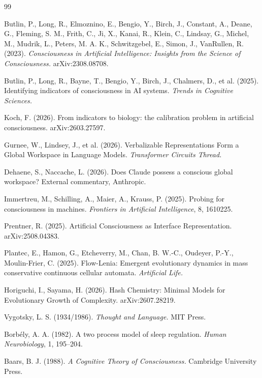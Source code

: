 \documentclass[11pt]{article}
\begin{document}
\begin{thebibliography}{99}

Butlin, P., Long, R., Elmoznino, E., Bengio, Y., Birch, J., Constant, A., Deane, G., Fleming, S. M., Frith, C., Ji, X., Kanai, R., Klein, C., Lindsay, G., Michel, M., Mudrik, L., Peters, M. A. K., Schwitzgebel, E., Simon, J., VanRullen, R. (2023).
\emph{Consciousness in Artificial Intelligence: Insights from the Science of Consciousness.}
arXiv:2308.08708.

Butlin, P., Long, R., Bayne, T., Bengio, Y., Birch, J., Chalmers, D., et al. (2025).
Identifying indicators of consciousness in AI systems.
\emph{Trends in Cognitive Sciences.}

Koch, F. (2026).
From indicators to biology: the calibration problem in artificial consciousness.
arXiv:2603.27597.

Gurnee, W., Lindsey, J., et al. (2026).
Verbalizable Representations Form a Global Workspace in Language Models.
\emph{Transformer Circuits Thread.}

Dehaene, S., Naccache, L. (2026).
Does Claude possess a conscious global workspace?
External commentary, Anthropic.

Immertreu, M., Schilling, A., Maier, A., Krauss, P. (2025).
Probing for consciousness in machines.
\emph{Frontiers in Artificial Intelligence}, 8, 1610225.

Prentner, R. (2025).
Artificial Consciousness as Interface Representation.
arXiv:2508.04383.

Plantec, E., Hamon, G., Etcheverry, M., Chan, B. W.-C., Oudeyer, P.-Y., Moulin-Frier, C. (2025).
Flow-Lenia: Emergent evolutionary dynamics in mass conservative continuous cellular automata.
\emph{Artificial Life.}

Horiguchi, I., Sayama, H. (2026).
Hash Chemistry: Minimal Models for Evolutionary Growth of Complexity.
arXiv:2607.28219.

Vygotsky, L. S. (1934/1986).
\emph{Thought and Language.} MIT Press.

Borbély, A. A. (1982).
A two process model of sleep regulation.
\emph{Human Neurobiology}, 1, 195--204.

Baars, B. J. (1988).
\emph{A Cognitive Theory of Consciousness.} Cambridge University Press.


\end{thebibliography}
\end{document}

